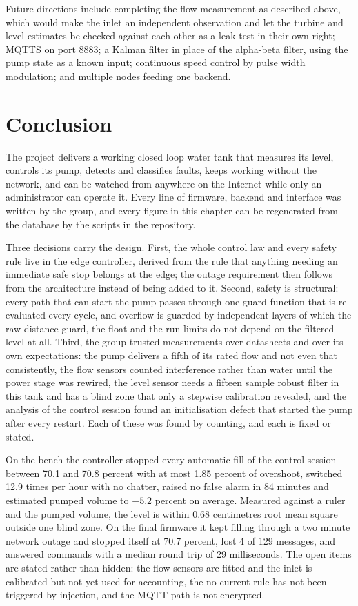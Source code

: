 Future directions include completing the flow measurement as described above, which would make the inlet an independent observation and let the turbine and level estimates be checked against each other as a leak test in their own right; MQTTS on port 8883; a Kalman filter in place of the alpha-beta filter, using the pump state as a known input; continuous speed control by pulse width modulation; and multiple nodes feeding one backend.

\section{Conclusion}
\label{sec:o8-9}

The project delivers a working closed loop water tank that measures its level, controls its pump, detects and classifies faults, keeps working without the network, and can be watched from anywhere on the Internet while only an administrator can operate it. Every line of firmware, backend and interface was written by the group, and every figure in this chapter can be regenerated from the database by the scripts in the repository.

Three decisions carry the design. First, the whole control law and every safety rule live in the edge controller, derived from the rule that anything needing an immediate safe stop belongs at the edge; the outage requirement then follows from the architecture instead of being added to it. Second, safety is structural: every path that can start the pump passes through one guard function that is re-evaluated every cycle, and overflow is guarded by independent layers of which the raw distance guard, the float and the run limits do not depend on the filtered level at all. Third, the group trusted measurements over datasheets and over its own expectations: the pump delivers a fifth of its rated flow and not even that consistently, the flow sensors counted interference rather than water until the power stage was rewired, the level sensor needs a fifteen sample robust filter in this tank and has a blind zone that only a stepwise calibration revealed, and the analysis of the control session found an initialisation defect that started the pump after every restart. Each of these was found by counting, and each is fixed or stated.

On the bench the controller stopped every automatic fill of the control session between 70.1 and 70.8 percent with at most 1.85 percent of overshoot, switched 12.9 times per hour with no chatter, raised no false alarm in 84 minutes and estimated pumped volume to $-5.2$ percent on average. Measured against a ruler and the pumped volume, the level is within 0.68 centimetres root mean square outside one blind zone. On the final firmware it kept filling through a two minute network outage and stopped itself at 70.7 percent, lost 4 of 129 messages, and answered commands with a median round trip of 29 milliseconds. The open items are stated rather than hidden: the flow sensors are fitted and the inlet is calibrated but not yet used for accounting, the no current rule has not been triggered by injection, and the MQTT path is not encrypted.

